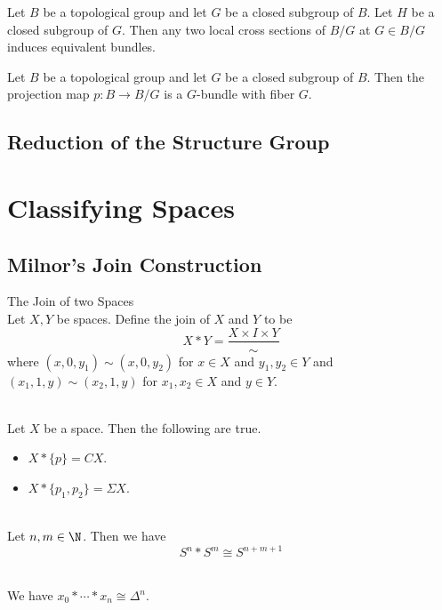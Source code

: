 \documentclass[a4paper]{article}
\begin{document}
\begin{thm}{}{} Let $B$ be a topological group and let $G$ be a closed subgroup of $B$. Let $H$ be a closed subgroup of $G$. Then any two local cross sections of $B/G$ at $G\in B/G$ induces equivalent bundles. 
\end{thm}

\begin{crl}{}{} Let $B$ be a topological group and let $G$ be a closed subgroup of $B$. Then the projection map $p:B\to B/G$ is a $G$-bundle with fiber $G$. 
\end{crl}

\subsection{Reduction of the Structure Group}

\pagebreak
\section{Classifying Spaces}
\subsection{Milnor's Join Construction}
\begin{defn}{The Join of two Spaces}{}\\
Let $X,Y$ be spaces. Define the join of $X$ and $Y$ to be $$X\ast Y=\frac{X\times I\times Y}{\sim}$$ where $(x,0,y_1)\sim(x,0,y_2)$ for $x\in X$ and $y_1,y_2\in Y$ and $(x_1,1,y)\sim(x_2,1,y)$ for $x_1,x_2\in X$ and $y\in Y$. 
\end{defn}

\begin{eg}{}{}\\
Let $X$ be a space. Then the following are true. 
\begin{itemize}
\item $X\ast\{p\}=CX$. 
\item $X\ast\{p_1,p_2\}=\Sigma X$. 
\end{itemize}
\end{eg}

\begin{eg}{}{}\\
Let $n,m\in\N$. Then we have $$S^n\ast S^m\cong S^{n+m+1}$$
\end{eg}

\begin{eg}{}{}\\
We have $x_0\ast\cdots\ast x_n\cong\Delta^n$. 
\end{eg}
\end{document}
